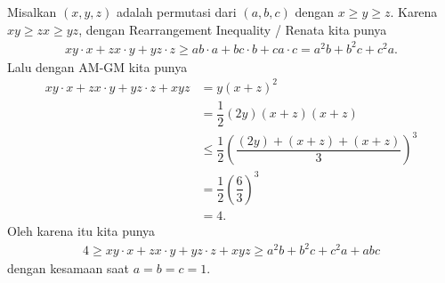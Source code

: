 
\begin{solusi}
    Misalkan $(x,y,z)$ adalah permutasi dari $(a,b,c)$ dengan $x \ge y \ge z$. Karena $xy \ge zx \ge yz$, dengan Rearrangement Inequality / Renata kita punya
    \begin{align*}
        xy \cdot x + zx \cdot y + yz \cdot z \ge ab\cdot a + bc \cdot b + ca \cdot c = a^2 b + b^2 c + c^2 a.
    \end{align*}
    Lalu dengan AM-GM kita punya
    \begin{align*}
        xy \cdot x + zx \cdot y + yz \cdot z + xyz &= y(x+z)^2\\
        &= \dfrac{1}{2}(2y)(x+z)(x+z)\\
        &\le \dfrac{1}{2}\left(\dfrac{(2y)+(x+z)+(x+z)}{3}\right)^3\\
        &= \dfrac{1}{2}\left(\dfrac{6}{3}\right)^3\\
        &= 4.
    \end{align*}
    Oleh karena itu kita punya
    \begin{align*}
        4 \ge xy \cdot x + zx \cdot y + yz \cdot z + xyz \ge a^2 b + b^2 c + c^2 a + abc
    \end{align*}
    dengan kesamaan saat $a=b=c=1$.
\end{solusi}